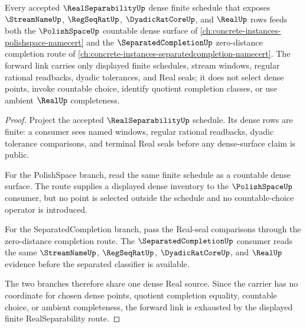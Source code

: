 \begin{theorem}
\label{thm:real-separability-real-density-forward-link}
Every accepted $\RealSeparabilityUp$ dense finite schedule that exposes $\StreamNameUp$, $\RegSeqRatUp$, $\DyadicRatCoreUp$, and $\RealUp$ rows feeds both the $\PolishSpaceUp$ countable dense surface of \autoref{ch:concrete-instances-polishspace-namecert} and the $\SeparatedCompletionUp$ zero-distance completion route of \autoref{ch:concrete-instances-separatedcompletion-namecert}. The forward link carries only displayed finite schedules, stream windows, regular rational readbacks, dyadic tolerances, and Real seals; it does not select dense points, invoke countable choice, identify quotient completion classes, or use ambient $\RealUp$ completeness.
\end{theorem}
\begin{proof}
Project the accepted $\RealSeparabilityUp$ schedule. Its dense rows are finite: a consumer sees named windows, regular rational readbacks, dyadic tolerance comparisons, and terminal Real seals before any dense-surface claim is public.

For the PolishSpace branch, read the same finite schedule as a countable dense surface. The route supplies a displayed dense inventory to the $\PolishSpaceUp$ consumer, but no point is selected outside the schedule and no countable-choice operator is introduced.

For the SeparatedCompletion branch, pass the Real-seal comparisons through the zero-distance completion route. The $\SeparatedCompletionUp$ consumer reads the same $\StreamNameUp$, $\RegSeqRatUp$, $\DyadicRatCoreUp$, and $\RealUp$ evidence before the separated classifier is available.

The two branches therefore share one dense Real source. Since the carrier has no coordinate for chosen dense points, quotient completion equality, countable choice, or ambient completeness, the forward link is exhausted by the displayed finite RealSeparability route.
\end{proof}
